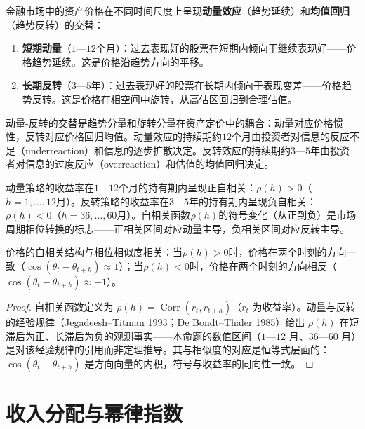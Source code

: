 \begin{definition}[资产价格的动量与反转]\label{def:momentum_reversal}
金融市场中的资产价格在不同时间尺度上呈现\textbf{动量效应}（趋势延续）和\textbf{均值回归}（趋势反转）的交替：
\begin{enumerate}[label=(\roman*)]
    \item \textbf{短期动量}（$1$—$12$个月）：过去表现好的股票在短期内倾向于继续表现好——价格趋势延续。这是价格沿趋势方向的平移。
    \item \textbf{长期反转}（$3$—$5$年）：过去表现好的股票在长期内倾向于表现变差——价格趋势反转。这是价格在相空间中旋转，从高估区回归到合理估值。
\end{enumerate}
动量-反转的交替是趋势分量和旋转分量在资产定价中的耦合：动量对应价格惯性，反转对应价格回归均值。动量效应的持续期约$12$个月由投资者对信息的反应不足（underreaction）和信息的逐步扩散决定。反转效应的持续期约$3$—$5$年由投资者对信息的过度反应（overreaction）和估值的均值回归决定。
\end{definition}

\begin{proposition}[价格动量的自相关结构]\label{prop:momentum_autocorr}
动量策略的收益率在$1$—$12$个月的持有期内呈现正自相关：$\rho(h) > 0$（$h = 1,\dots,12$月）。反转策略的收益率在$3$—$5$年的持有期内呈现负自相关：$\rho(h) < 0$（$h = 36,\dots,60$月）。自相关函数$\rho(h)$的符号变化（从正到负）是市场周期相位转换的标志——正相关区间对应动量主导，负相关区间对应反转主导。

价格的自相关结构与相位相似度相关：当$\rho(h) > 0$时，价格在两个时刻的方向一致（$\cos(\theta_t - \theta_{t+h}) \approx 1$）；当$\rho(h) < 0$时，价格在两个时刻的方向相反（$\cos(\theta_t - \theta_{t+h}) \approx -1$）。
\end{proposition}

\begin{proof}
自相关函数定义为 $\rho(h) = \operatorname{Corr}(r_t, r_{t+h})$（$r_t$ 为收益率）。动量与反转的经验规律（Jegadeesh–Titman 1993；De Bondt–Thaler 1985）给出 $\rho(h)$ 在短滞后为正、长滞后为负的观测事实——本命题的数值区间（$1$—$12$ 月、$36$—$60$ 月）是对该经验规律的引用而非定理推导。其与相似度的对应是恒等式层面的：$\cos(\theta_t - \theta_{t+h})$ 是方向向量的内积，符号与收益率的同向性一致。
\end{proof}

\section{收入分配与幂律指数}

